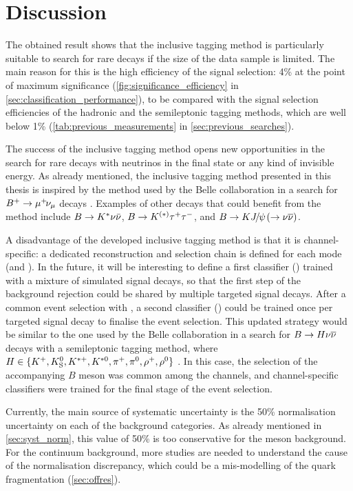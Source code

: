 \section{Discussion} \label{sec:discussion}
The obtained result shows that the inclusive tagging method is particularly suitable to search for rare decays if the size of the data sample is limited.
The main reason for this is the high efficiency of the signal selection: 4\% at the point of maximum significance (\cref{fig:significance_efficiency} in \cref{sec:classification_performance}), to be compared with the signal selection efficiencies of the hadronic and the semileptonic tagging methods, which are well below 1\% (\cref{tab:previous_measurements} in \cref{sec:previous_searches}).

The success of the inclusive tagging method opens new opportunities in the search for rare decays with neutrinos in the final state or any kind of invisible energy.
As already mentioned, the inclusive tagging method presented in this thesis is inspired by the method used by the Belle collaboration in a search for $B^+\rightarrow\mu^+\!\nu_\mu$ decays \cite{Belle:2019iji}.
Examples of other decays that could benefit from the method include $B\rightarrow K^*\nu\bar{\nu}$, $B\rightarrow K^{(*)}\tau^+\tau^-$, and $B\rightarrow K{J\mskip -3mu/\mskip -2mu\psi\mskip 2mu}(\rightarrow\nu{\overline{\nu}})$. 

A disadvantage of the developed inclusive tagging method is that it is channel-specific: a dedicated reconstruction and selection chain is defined for each mode (\BKpnn and \BKznn).
In the future, it will be interesting to define a first classifier (\bdto) trained with a mixture of simulated signal decays, so that the first step of the background rejection could be shared by multiple targeted signal decays.
After a common event selection with \bdto, a second classifier (\bdtt) could be trained once per targeted signal decay to finalise the event selection.
This updated strategy would be similar to the one used by the Belle collaboration in a search for $B\rightarrow H\nu{\overline{\nu}}$ decays with a semileptonic tagging method, where $H\in\{K^+,K^0_{\mathrm{S}},K^{*+},K^{*0},\pi^+,\pi^0,\rho^+,\rho^0\}$ \cite{Belle:2017oht}.
In this case, the selection of the accompanying $B$ meson was common among the channels, and channel-specific classifiers were trained for the final stage of the event selection.

Currently, the main source of systematic uncertainty is the 50\% normalisation uncertainty on each of the background categories.
As already mentioned in \cref{sec:syst_norm}, this value of 50\% is too conservative for the \B meson background.
For the continuum background, more studies are needed to understand the cause of the normalisation discrepancy, which could be a mis-modelling of the quark fragmentation (\cref{sec:offres}).

